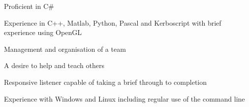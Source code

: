 


\begin{cvparagraph}
    
    \begin{cvitems}
        \text{}
        \item
        \item Proficient in C\# 
        \item Experience in C++, Matlab, Python, Pascal and Kerboscript with brief experience using OpenGL
        \item Management and organisation of a team
        \item A desire to help and teach others
        \item Responsive listener capable of taking a brief through to completion
        \item Experience with Windows and Linux including regular use of the command line
    \end{cvitems}

\end{cvparagraph}